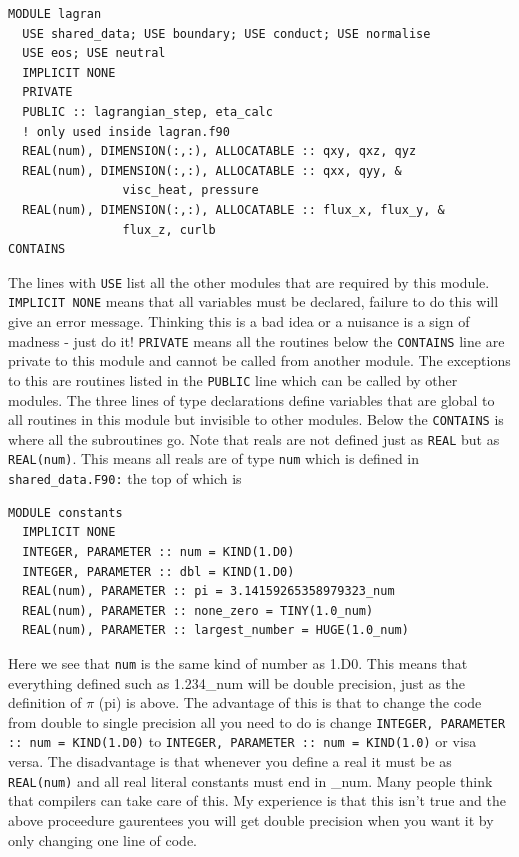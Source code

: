 \documentclass[11pt]{article}
\begin{document}
\begin{verbatim}
MODULE lagran
  USE shared_data; USE boundary; USE conduct; USE normalise
  USE eos; USE neutral
  IMPLICIT NONE
  PRIVATE
  PUBLIC :: lagrangian_step, eta_calc
  ! only used inside lagran.f90
  REAL(num), DIMENSION(:,:), ALLOCATABLE :: qxy, qxz, qyz
  REAL(num), DIMENSION(:,:), ALLOCATABLE :: qxx, qyy, &
                visc_heat, pressure
  REAL(num), DIMENSION(:,:), ALLOCATABLE :: flux_x, flux_y, &
                flux_z, curlb
CONTAINS
\end{verbatim}
The lines with \texttt{USE} list all the other modules that are required by this module. \texttt{IMPLICIT NONE} means that all variables must be declared, failure to do this will give an error message. Thinking this is a bad idea or a nuisance is a sign of madness - just do it! \texttt{PRIVATE} means all the routines below the \texttt{CONTAINS} line are private to this module and cannot be called from another module. The exceptions to this are routines listed in the \texttt{PUBLIC} line which can be called by other modules. The three lines of type declarations define variables that are global to all routines in this module but invisible to other modules. Below the \texttt{CONTAINS} is where all the subroutines go. Note that reals are not defined just as \texttt{REAL} but as \texttt{REAL(num)}. This means all reals are of type \texttt{num} which is defined in {\texttt{shared\_data.F90:}} the top of which is
\begin{verbatim}
MODULE constants
  IMPLICIT NONE
  INTEGER, PARAMETER :: num = KIND(1.D0)
  INTEGER, PARAMETER :: dbl = KIND(1.D0)
  REAL(num), PARAMETER :: pi = 3.14159265358979323_num
  REAL(num), PARAMETER :: none_zero = TINY(1.0_num)
  REAL(num), PARAMETER :: largest_number = HUGE(1.0_num)
\end{verbatim}
Here we see that \texttt{num} is the same kind of number as 1.D0. This means that everything defined such as 1.234\_num will be double precision, just as the definition of $\pi$ (pi) is above. The advantage of this is that to change the code from double to single precision all you need to do is change \texttt{INTEGER, PARAMETER :: num = KIND(1.D0)} to \texttt{INTEGER, PARAMETER :: num = KIND(1.0)} or visa versa. The disadvantage is that whenever you define a real it must be as \texttt{REAL(num)} and all real literal constants must end in \_num. Many people think that compilers can take care of this. My experience is that this isn't true and the above proceedure gaurentees you will get double precision when you want it by only changing one line of code.
\end{document}
